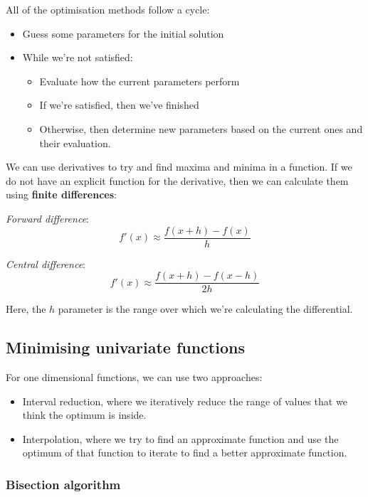 All of the optimisation methods follow a cycle:

\begin{itemize}
  \item Guess some parameters for the initial solution
  \item While we're not satisfied:
  \begin{itemize}
    \item Evaluate how the current parameters perform
    \item If we're satisfied, then we've finished
    \item Otherwise, then determine new parameters based on the current ones
      and their evaluation.
  \end{itemize}
\end{itemize}

We can use derivatives to try and find maxima and minima in a function. If we do
not have an explicit function for the derivative, then we can calculate them
using \textbf{finite differences}:

\begin{description}
  \item \textit{Forward difference}:\\
    \[
      f'(x) \approx \frac{f(x + h) - f(x)}{h}
    \]
  \item \textit{Central difference}:\\
    \[
      f'(x) \approx \frac{f(x + h) - f(x - h)}{2h}
    \]
\end{description}

Here, the $h$ parameter is the range over which we're calculating the
differential.

\subsection{Minimising univariate functions}

For one dimensional functions, we can use two approaches:

\begin{itemize}
  \item Interval reduction, where we iteratively reduce the range of values that
  we think the optimum is inside.
  \item Interpolation, where we try to find an approximate function and use the
  optimum of that function to iterate to find a better approximate function.
\end{itemize}

\subsubsection{Bisection algorithm}

